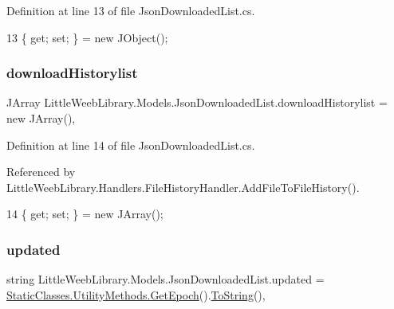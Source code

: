 Definition at line 13 of file Json\+Downloaded\+List.\+cs.


\begin{DoxyCode}
13 \{ \textcolor{keyword}{get}; \textcolor{keyword}{set}; \} = \textcolor{keyword}{new} JObject();
\end{DoxyCode}
\mbox{\label{class_little_weeb_library_1_1_models_1_1_json_downloaded_list_a703b2878786376f7a1ad264118a70d75}} 
\subsubsection{\texorpdfstring{download\+Historylist}{downloadHistorylist}}
{\footnotesize\ttfamily J\+Array Little\+Weeb\+Library.\+Models.\+Json\+Downloaded\+List.\+download\+Historylist = new J\+Array()\hspace{0.3cm}{\ttfamily [get]}, {\ttfamily [set]}}



Definition at line 14 of file Json\+Downloaded\+List.\+cs.



Referenced by Little\+Weeb\+Library.\+Handlers.\+File\+History\+Handler.\+Add\+File\+To\+File\+History().


\begin{DoxyCode}
14 \{ \textcolor{keyword}{get}; \textcolor{keyword}{set}; \} = \textcolor{keyword}{new} JArray();
\end{DoxyCode}
\mbox{\label{class_little_weeb_library_1_1_models_1_1_json_downloaded_list_a3b07c23e2d9771cd069857ff761d20e2}} 
\subsubsection{\texorpdfstring{updated}{updated}}
{\footnotesize\ttfamily string Little\+Weeb\+Library.\+Models.\+Json\+Downloaded\+List.\+updated = \mbox{\hyperlink{class_little_weeb_library_1_1_static_classes_1_1_utility_methods_a12336d9e64983ddabaad8950486fafb2}{Static\+Classes.\+Utility\+Methods.\+Get\+Epoch}}().\mbox{\hyperlink{class_little_weeb_library_1_1_models_1_1_json_downloaded_list_a85d819ca67ad513254f77d395eef4816}{To\+String}}()\hspace{0.3cm}{\ttfamily [get]}, {\ttfamily [set]}}



